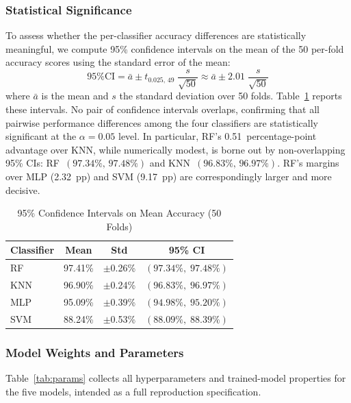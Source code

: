 \documentclass[journal]{IEEEtran}
\begin{document}
\subsubsection{Statistical Significance}

To assess whether the per-classifier accuracy differences are
statistically meaningful, we compute 95\% confidence intervals on the
mean of the 50 per-fold accuracy scores using the standard error of the
mean:
\begin{equation}
  \text{95\% CI} = \bar{a} \pm t_{0.025,\,49}\;\frac{s}{\sqrt{50}}
  \approx \bar{a} \pm 2.01\;\frac{s}{\sqrt{50}}
\end{equation}
where $\bar{a}$ is the mean and $s$ the standard deviation over 50 folds.
Table~\ref{tab:ci} reports these intervals. No pair of confidence
intervals overlaps, confirming that all pairwise performance differences
among the four classifiers are statistically significant at the
$\alpha = 0.05$ level. In particular, RF's 0.51~percentage-point
advantage over KNN, while numerically modest, is borne out by
non-overlapping 95\% CIs: RF~$(97.34\%,\,97.48\%)$ and
KNN~$(96.83\%,\,96.97\%)$. RF's margins over MLP (2.32~pp) and SVM
(9.17~pp) are correspondingly larger and more decisive.

\begin{table}[!t]
\caption{95\% Confidence Intervals on Mean Accuracy (50 Folds)}
\label{tab:ci}
\centering
\renewcommand{\arraystretch}{1.1}
\begin{tabular}{lccc}
\toprule
\textbf{Classifier} & \textbf{Mean} & \textbf{Std} & \textbf{95\% CI} \\
\midrule
RF  & 97.41\% & $\pm$0.26\% & $(97.34\%,\;97.48\%)$ \\
KNN & 96.90\% & $\pm$0.24\% & $(96.83\%,\;96.97\%)$ \\
MLP & 95.09\% & $\pm$0.39\% & $(94.98\%,\;95.20\%)$ \\
SVM & 88.24\% & $\pm$0.53\% & $(88.09\%,\;88.39\%)$ \\
\bottomrule
\end{tabular}
\end{table}

\subsubsection{Model Weights and Parameters}

Table~\ref{tab:params} collects all hyperparameters and trained-model
properties for the five models, intended as a full reproduction
specification.
\end{document}
